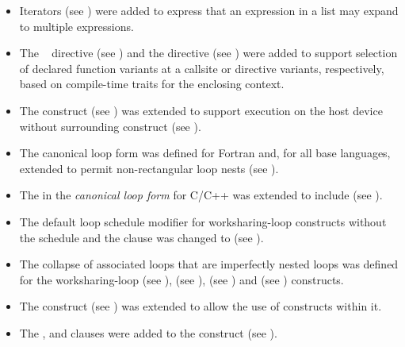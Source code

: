\begin{itemize}
\item Iterators (see ) were added to express that an
      expression in a list may expand to multiple expressions.

\item The ~ directive (see
      ) and the 
      directive (see ) were
      added to support selection of declared function variants at a callsite
      or directive variants, respectively, based on compile-time traits for
      the enclosing context.

\item The  construct (see ) was
      extended to support execution on the host device without surrounding
       construct (see ).

\item The canonical loop form was defined for Fortran and, for all base
      languages, extended to permit non-rectangular loop nests (see
      ).

\item The  in the \textit{canonical loop form} for C/C++ was
      extended to include \code{!=} (see ).

\item The default loop schedule modifier for worksharing-loop constructs 
      without the  schedule and the  clause 
      was changed to  (see 
      ).

\item The collapse of associated loops that are imperfectly nested loops
      was defined for the worksharing-loop (see ),
       (see ), 
      (see ) and  (see
      ) constructs.

\item The  construct (see ) was extended
      to allow the use of  constructs within it.

\item The ,  and  clauses were added to the
       construct (see ).


\end{itemize}
